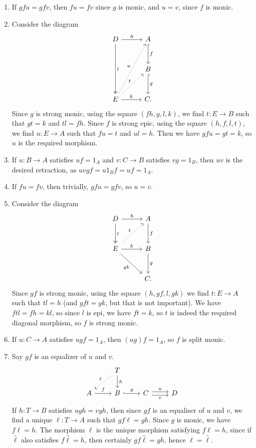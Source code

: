 \begin{enumerate}[label=(\alph*)]
	\item If $gfu = gfv$, then $fu = fv$ since $g$ is monic, and $u = v$, since
		$f$ is monic.
	\item Consider the diagram
		\[\begin{tikzcd}[row sep=1cm, column sep=1cm]
			D\ar[r, "h"]\ar[dd, two heads, "l"] & A\ar[d, "f", hook]\\
			& B\ar[d, "g", hook]\\
			E\ar[r, "k"]\ar[ur, "t", densely dotted]\ar[uur, "u", densely dotted]&C.
		\end{tikzcd}\]
		Since $g$ is strong monic, using the square $(fh, g, l, k)$,
		we find $t\colon E\to B$ such that
		$gt = k$ and $tl = fh$. Since $f$ is strong epic, using the square
		$(h, f, l, t)$, we find $u\colon E\to A$ such that $fu = t$ and $ul = h$.
		Then we have $gfu = gt = k$, so $u$ is the required morphism.
	\item If $u\colon B\to A$ satisfies $uf = 1_A$ and $v\colon C\to B$ satisfies
		$vg = 1_B$, then $uv$ is the desired retraction, as $uvgf= u1_Bf = uf = 1_A$.
	\item If $fu = fv$, then trivially, $gfu = gfv$, so $u = v$.
	\item Consider the diagram
		\[\begin{tikzcd}[row sep=1cm, column sep=1cm]
			D\ar[r, "h"]\ar[d, two heads, "l"] & A\ar[d, "f"]\\
			E\ar[ur, densely dotted, "t"]\ar[r, "k"]\ar[dr, "gk" below left] & B\ar[d, "g"]\\
			&C.
		\end{tikzcd}\]
		Since $gf$ is strong monic, using the square $(h, gf, l, gk)$ we find
		$t\colon E\to A$ such that $tl = h$ (and $gft = gk$, but that is not
		important). We have $ftl = fh = kl$, so since $l$ is epi, we have $ft = k$,
		so $t$ is indeed the required diagonal morphism, so  $f$ is strong monic.
	\item If  $u\colon C\to A$ satisfies $ugf = 1_A$, then $(ug)f = 1_A$, so
		$f$ is split monic.
	\item Say $gf$ is an equalizer of $u$ and $v$.
		\[\begin{tikzcd}
			& T\ar[d, "h"]\ar[dl, densely dotted, "\ell" above left]\\
			A\ar[r, "f"] & B\ar[r, "g", hook] & C\ar[r, shift left, "u"]\ar[r, shift right, "v" below] & D
		\end{tikzcd}\]
		If $h\colon T\to B$ satisfies $ugh = vgh$, then since $gf$ is an equaliser of
		$u$ and $v$, we find a unique $\ell\colon T\to A $ such that $gf\ell = gh$.
		Since $g$ is monic, we have $f\ell = h$. The morphism $\ell$ is the unique
		morphism satisfying $f\ell = h$, since if $\hat{\ell}$ also satisfies
		$f\hat{\ell} = h$, then certainly $gf\hat{\ell} = gh$, hence $\ell = \hat{\ell}$.
\end{enumerate}
